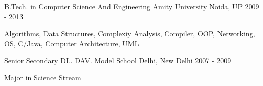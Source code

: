 \begin{cventries}
  \cventry
    {B.Tech. in Computer Science And Engineering}
    {Amity University}
    {Noida, UP}
    {2009 - 2013}
    {
      \begin{cvitems}
        \item {Algorithms, Data Structures, Complexiy Analysis, Compiler, OOP, Networking, OS, C/Java, Computer Architecture, UML}
      \end{cvitems}
    }
   \cventry
    {Senior Secondary}
    {DL. DAV. Model School}
    {Delhi, New Delhi}
    {2007 - 2009}
    {
      \begin{cvitems}
        \item {Major in Science Stream}
      \end{cvitems}
    }
\end{cventries}
